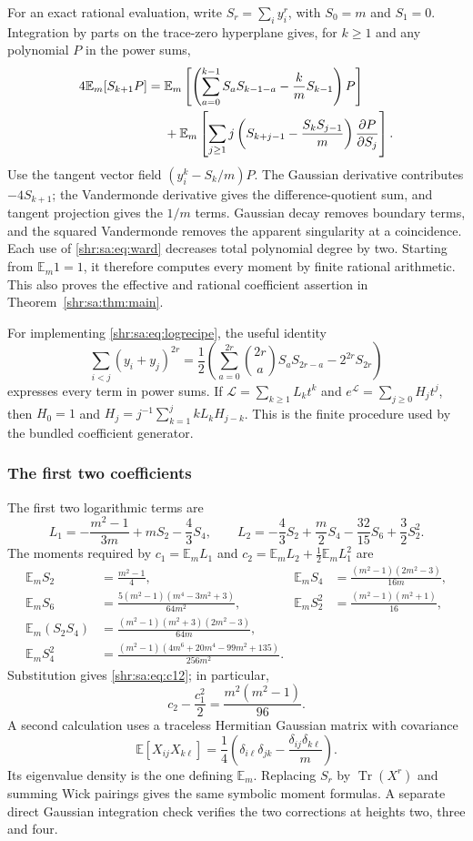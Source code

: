 \documentclass[11pt,letterpaper]{article}
\numberwithin{equation}{section}
\theoremstyle{definition}
\newcommand{\E}{\mathbb E}
\newcommand{\1}{\mathbf 1}
\DeclareMathOperator{\Tr}{Tr}
\begin{document}
For an exact rational evaluation, write $S_r=\sum_i y_i^r$, with $S_0=m$ and $S_1=0$. Integration by parts on the trace-zero hyperplane gives, for $k\ge1$ and any polynomial $P$ in the power sums,
\begin{align}\label{shr:sa:eq:ward}
 4\E_m[S_{k+1}P]={}&
 \E_m\left[\left(\sum_{a=0}^{k-1}S_aS_{k-1-a}
                      -\frac{k}{m}S_{k-1}\right)P\right]\notag\\
 &+\E_m\left[\sum_{j\ge1}j\left(S_{k+j-1}
             -\frac{S_kS_{j-1}}m\right)\frac{\partial P}{\partial S_j}\right].
\end{align}
Use the tangent vector field $(y_i^k-S_k/m)P$. The Gaussian derivative contributes $-4S_{k+1}$; the Vandermonde derivative gives the difference-quotient sum, and tangent projection gives the $1/m$ terms. Gaussian decay removes boundary terms, and the squared Vandermonde removes the apparent singularity at a coincidence. Each use of \eqref{shr:sa:eq:ward} decreases total polynomial degree by two. Starting from $\E_m1=1$, it therefore computes every moment by finite rational arithmetic. This also proves the effective and rational coefficient assertion in Theorem~\ref{shr:sa:thm:main}.

For implementing \eqref{shr:sa:eq:logrecipe}, the useful identity
\[
 \sum_{i<j}(y_i+y_j)^{2r}
 =\frac12\left(\sum_{a=0}^{2r}\binom{2r}{a}S_aS_{2r-a}
                              -2^{2r}S_{2r}\right)
\]
expresses every term in power sums. If $\mathcal L=\sum_{k\ge1}L_kt^k$ and
$e^{\mathcal L}=\sum_{j\ge0}H_jt^j$, then
$H_0=1$ and $H_j=j^{-1}\sum_{k=1}^j kL_kH_{j-k}$. This is the finite procedure used by the bundled coefficient generator.

\subsubsection{The first two coefficients}
The first two logarithmic terms are
\[
 L_1=-\frac{m^2-1}{3m}+mS_2-\frac43S_4,\qquad
 L_2=-\frac43S_2+\frac m2S_4-\frac{32}{15}S_6+\frac32S_2^2.
\]
The moments required by $c_1=\E_mL_1$ and
$c_2=\E_mL_2+\tfrac12\E_mL_1^2$ are
\begin{align*}
 \E_mS_2&=\frac{m^2-1}{4},&
 \E_mS_4&=\frac{(m^2-1)(2m^2-3)}{16m},\\
 \E_mS_6&=\frac{5(m^2-1)(m^4-3m^2+3)}{64m^2},&
 \E_mS_2^2&=\frac{(m^2-1)(m^2+1)}{16},\\
 \E_m(S_2S_4)&=\frac{(m^2-1)(m^2+3)(2m^2-3)}{64m},\\
 \E_mS_4^2&=\frac{(m^2-1)(4m^6+20m^4-99m^2+135)}{256m^2}.
\end{align*}
Substitution gives \eqref{shr:sa:eq:c12}; in particular,
\begin{equation}\label{shr:sa:eq:logc2}
 c_2-\frac{c_1^2}{2}=\frac{m^2(m^2-1)}{96}.
\end{equation}
A second calculation uses a traceless Hermitian Gaussian matrix with covariance
\[
 \E[X_{ij}X_{k\ell}]=\frac14
       \left(\delta_{i\ell}\delta_{jk}-\frac{\delta_{ij}\delta_{k\ell}}m\right).
\]
Its eigenvalue density is the one defining $\E_m$. Replacing $S_r$ by $\Tr(X^r)$ and summing Wick pairings gives the same symbolic moment formulas. A separate direct Gaussian integration check verifies the two corrections at heights two, three and four.
\end{document}
